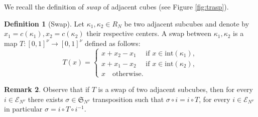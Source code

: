 \documentclass[12 pt]{article}
\theoremstyle{definition} \newtheorem{definition}{Definition}[section]
\theoremstyle{definition} \newtheorem{remark}[definition]{Remark}
\theoremstyle{plain} \newtheorem{lemma}[definition]{Lemma}
\theoremstyle{plain} \newtheorem{proposition}[definition]{Proposition}
\theoremstyle{plain} \newtheorem{theorem}[definition]{Theorem}
\theoremstyle{plain} \newtheorem{corollary}[definition]{Corollary}
\theoremstyle{definition} \newtheorem{example}[definition]{Example}
\theoremstyle{definition} \newtheorem{assumption}[definition]{Assumption}
\theoremstyle{definition} \newtheorem{conjecture}[definition]{Conjecture}
\newcommand{\1}{\mathbbm 1}
\numberwithin{equation}{section}
\begin{document}
We recall the definition of \emph{swap} of adjacent cubes (see Figure \ref{fig:trasp}).
\begin{definition}[Swap]
\label{def:swap}
    Let $\kappa_1,\kappa_2\in R_N$ be two adjacent subcubes and denote by $x_1=c(\kappa_1),x_2=c(\kappa_2)$ their respective centers. A swap between $\kappa_1,\kappa_2$ is a map $T:[0,1]^\nu\rightarrow [0,1]^\nu$ defined as follows:
    \begin{equation}\label{eq:swap}
        T(x)=\begin{cases}
              x+x_2-x_1 \quad\text{ if } x\in \text{int}(\kappa_1), \\ 
              x+x_1-x_2 \quad\text{ if } x\in \text{int}(\kappa_2), \\
              x \quad\text{otherwise}.
        \end{cases}
    \end{equation}
\end{definition}
\begin{remark}
    Observe that if $T$ is a swap of two adjacent subcubes, then for every $i\in \mathcal{E}_{N^\nu}$ there exists $\sigma\in \mathfrak S_{N^\nu}$ transposition such that $\sigma\circ i=i\circ T$, for every $i\in\mathcal{E}_{N^\nu}$ in particular $\sigma=i\circ T\circ i^{-1}$.\end{remark}
    


\end{document}
